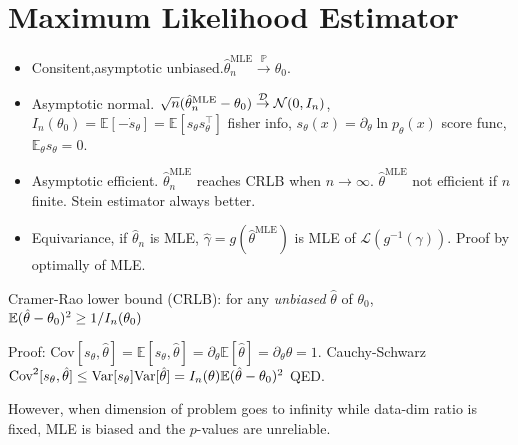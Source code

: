 \section{Maximum Likelihood Estimator}
\begin{itemize}[itemsep=0pt,topsep=0pt, leftmargin=2pt, itemindent=5pt, labelwidth=5pt]
    \item Consitent,asymptotic unbiased.$\hat{\theta}^{\mathrm{MLE}}_n\overset{\mathbb{P}}{\to}\theta_0$.
    \item Asymptotic normal. $\sqrt{n}(\hat{\theta}^{\mathrm{MLE}}_n-\theta_0) \overset{\mathcal{D}}{\to} \mathcal{N}(0, I_n)$, $I_n(\theta_0)= \mathbb{E}[- \dot{s}_\theta ] = \mathbb{E}[s_\theta s_\theta^{\top}]$ fisher info, $s_\theta(x) = \partial_\theta \ln p_\theta(x)$ score func, $\mathbb{E}_{\theta}s_\theta = 0$.
    \item Asymptotic efficient. $\hat{\theta}^{\mathrm{MLE}}_n$ reaches CRLB when $n\rightarrow \infty$. $\hat{\theta}^{\mathrm{MLE}}$ not  efficient if $n$ finite. Stein estimator always better.
    \item Equivariance, if $\hat{\theta}_n$ is MLE, $\hat{\gamma} = g(\hat{\theta}^{\mathrm{MLE}})$ is MLE of $\mathcal{L}(g^{-1}(\gamma))$. Proof by optimally of MLE.
\end{itemize}

Cramer-Rao lower bound (CRLB): for any \emph{unbiased} $\hat{\theta}$ of $\theta_0$, $\mathbb{E} (\hat{\theta}-\theta_0)^2 \ge 1/I_n(\theta_0)$

Proof: $\text{Cov}[s_\theta, \hat{\theta}] = \mathbb{E}[s_\theta, \hat{\theta}] = \partial_\theta  \mathbb{E}[\hat{\theta}] = \partial_\theta \theta = 1$. Cauchy-Schwarz $\text{Cov}^2[s_\theta, \hat{\theta}]\leq \text{Var}[s_\theta] \text{Var}[\hat{\theta}] = I_n(\theta) \mathbb{E} (\hat{\theta}-\theta_0)^2$ QED.

However, when dimension of problem goes to infinity while data-dim ratio is fixed, MLE is biased and the $p$-values are unreliable. 
